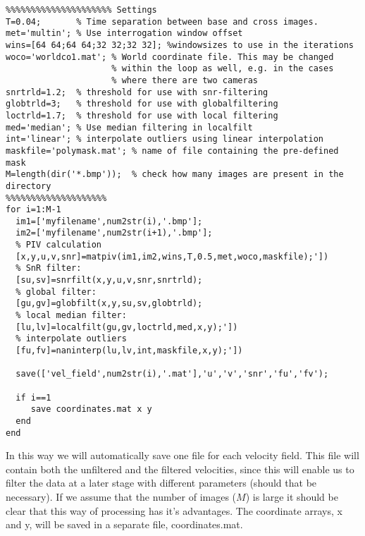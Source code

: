 \documentclass{book}
\begin{document}
\begin{verbatim}
%%%%%%%%%%%%%%%%%%%%% Settings
T=0.04;       % Time separation between base and cross images.
met='multin'; % Use interrogation window offset
wins=[64 64;64 64;32 32;32 32]; %windowsizes to use in the iterations
woco='worldco1.mat'; % World coordinate file. This may be changed
                     % within the loop as well, e.g. in the cases 
                     % where there are two cameras
snrtrld=1.2;  % threshold for use with snr-filtering
globtrld=3;   % threshold for use with globalfiltering
loctrld=1.7;  % threshold for use with local filtering
med='median'; % Use median filtering in localfilt
int='linear'; % interpolate outliers using linear interpolation
maskfile='polymask.mat'; % name of file containing the pre-defined mask
M=length(dir('*.bmp'));  % check how many images are present in the directory
%%%%%%%%%%%%%%%%%%%%
for i=1:M-1
  im1=['myfilename',num2str(i),'.bmp']; 
  im2=['myfilename',num2str(i+1),'.bmp']; 
  % PIV calculation
  [x,y,u,v,snr]=matpiv(im1,im2,wins,T,0.5,met,woco,maskfile);'])
  % SnR filter:
  [su,sv]=snrfilt(x,y,u,v,snr,snrtrld);
  % global filter:
  [gu,gv]=globfilt(x,y,su,sv,globtrld);
  % local median filter:
  [lu,lv]=localfilt(gu,gv,loctrld,med,x,y);'])
  % interpolate outliers
  [fu,fv]=naninterp(lu,lv,int,maskfile,x,y);'])

  save(['vel_field',num2str(i),'.mat'],'u','v','snr','fu','fv');

  if i==1
     save coordinates.mat x y
  end
end
\end{verbatim}

In this way we will automatically save one file for each velocity field.
This file will contain both the unfiltered and the filtered velocities,
since this will enable us to filter the data at a later stage with
different parameters (should that be necessary). If we assume that the
number of images ($M$) is large it should be clear that this way of
processing has it's advantages. The coordinate arrays, x and y, will be
saved in a separate file, coordinates.mat.
\end{document}
